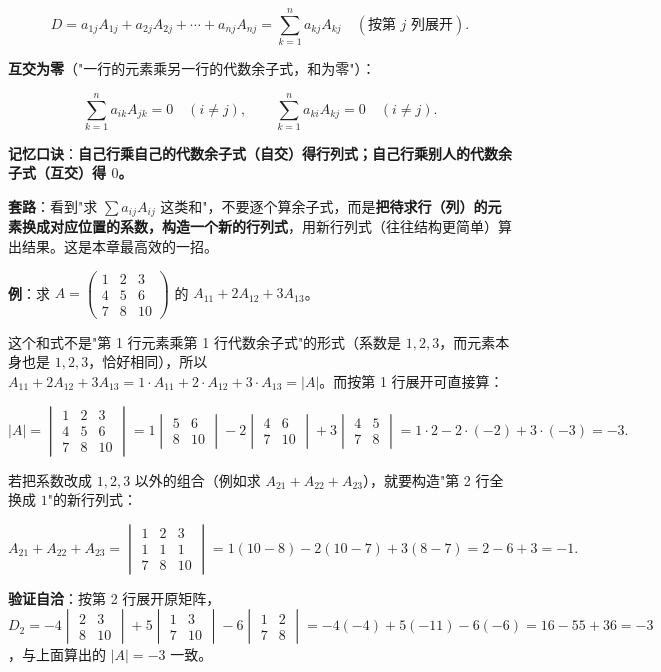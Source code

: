 \documentclass[11pt,openany,UTF8]{ctexbook}
\begin{document}
\[D=a_{1j}A_{1j}+a_{2j}A_{2j}+\cdots+a_{nj}A_{nj}=\sum_{k=1}^{n}a_{kj}A_{kj}\quad(\text{按第 }j\text{ 列展开}).\]

\textbf{互交为零}（"一行的元素乘另一行的代数余子式，和为零"）：

\[\sum_{k=1}^{n}a_{ik}A_{jk}=0\quad(i\ne j),\qquad \sum_{k=1}^{n}a_{ki}A_{kj}=0\quad(i\ne j).\]

\textbf{记忆口诀}：\textbf{自己行乘自己的代数余子式（自交）得行列式；自己行乘别人的代数余子式（互交）得 $0$。}

\textbf{套路}：看到"求 $\sum a_{ij}A_{ij}$ 这类和"，不要逐个算余子式，而是\textbf{把待求行（列）的元素换成对应位置的系数，构造一个新的行列式}，用新行列式（往往结构更简单）算出结果。这是本章最高效的一招。

\textbf{例}：求 $A=\begin{pmatrix}1&2&3\\4&5&6\\7&8&10\end{pmatrix}$ 的 $A_{11}+2A_{12}+3A_{13}$。

这个和式不是"第 1 行元素乘第 1 行代数余子式"的形式（系数是 $1,2,3$，而元素本身也是 $1,2,3$，恰好相同），所以 $A_{11}+2A_{12}+3A_{13}=1\cdot A_{11}+2\cdot A_{12}+3\cdot A_{13}=\vert A\vert$。而按第 1 行展开可直接算：

\[\vert A\vert=\begin{vmatrix}1&2&3\\4&5&6\\7&8&10\end{vmatrix}=1\begin{vmatrix}5&6\\8&10\end{vmatrix}-2\begin{vmatrix}4&6\\7&10\end{vmatrix}+3\begin{vmatrix}4&5\\7&8\end{vmatrix}=1\cdot2-2\cdot(-2)+3\cdot(-3)=-3 .\]

若把系数改成 $1,2,3$ 以外的组合（例如求 $A_{21}+A_{22}+A_{23}$），就要构造"第 2 行全换成 $1$"的新行列式：

\[A_{21}+A_{22}+A_{23}=\begin{vmatrix}1&2&3\\1&1&1\\7&8&10\end{vmatrix}=1(10-8)-2(10-7)+3(8-7)=2-6+3=-1 .\]

\textbf{验证自洽}：按第 2 行展开原矩阵，$D_2=-4\begin{vmatrix}2&3\\8&10\end{vmatrix}+5\begin{vmatrix}1&3\\7&10\end{vmatrix}-6\begin{vmatrix}1&2\\7&8\end{vmatrix}=-4(-4)+5(-11)-6(-6)=16-55+36=-3$，与上面算出的 $\vert A\vert=-3$ 一致。
\end{document}
